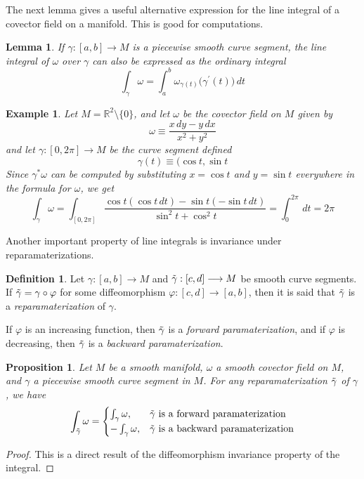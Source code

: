 \documentclass{article}
\newtheorem{proposition}[theorem]{Proposition}
\newtheorem{lemma}[theorem]{Lemma}
\newtheorem{example}{Example}[section]
\theoremstyle{remark}
\theoremstyle{definition}
\newtheorem{definition}{Definition}[section]
\begin{document}
    The next lemma gives a useful alternative expression for the line integral of a covector field on a manifold. This is good for computations.

    \begin{lemma}
    If $\gamma: [a,b] \longrightarrow M$ is a piecewise smooth curve segment, the line integral of $\omega$ over $\gamma$ can also be expressed as the ordinary integral 
    \[\int_\gamma \omega = \int_a^b \omega_{\gamma(t)} \big( \gamma^\prime (t) \big)\,dt\]
    \end{lemma}

    \begin{example}
    Let $M = \mathbb{R}^2 \setminus \{0\}$, and let $\omega$ be the covector field on $M$ given by
    \[\omega \equiv \frac{x \,dy - y\,dx}{x^2 + y^2}\]
    and let $\gamma: [0, 2\pi] \longrightarrow M$ be the curve segment defined 
    \[\gamma(t) \equiv \big( \cos{t}, \sin{t} \]
    Since $\gamma^* \omega$ can be computed by substituting $x = \cos{t}$ and $y = \sin{t}$ everywhere in the formula for $\omega$, we get
    \[\int_\gamma \omega = \int_{[0,2\pi]} \frac{\cos{t} (\cos{t}\,dt) - \sin{t} (-\sin{t}\,dt)}{\sin^2{t} + \cos^2{t}} = \int_0^{2\pi} \,dt = 2\pi\]
    \end{example}

    Another important property of line integrals is invariance under reparamaterizations.

    \begin{definition}
    Let $\gamma: [a,b] \longrightarrow M$ and $\Tilde{\gamma}: [c,d] \longrightarrow M$ be smooth curve segments. If $\Tilde{\gamma} = \gamma \circ \varphi$ for some diffeomorphism $\varphi: [c,d] \longrightarrow [a,b]$, then it is said that $\Tilde{\gamma}$ is a \textit{reparamaterization} of $\gamma$. 

    If $\varphi$ is an increasing function, then $\Tilde{\gamma}$ is a \textit{forward paramaterization}, and if $\varphi$ is decreasing, then $\Tilde{\gamma}$ is a \textit{backward paramaterization}. 
    \end{definition}

    \begin{proposition}
    Let $M$ be a smooth manifold, $\omega$ a smooth covector field on $M$, and $\gamma$ a piecewise smooth curve segment in $M$. For any reparamaterization $\Tilde{\gamma}$ of $\gamma$, we have
    \[\int_{\Tilde{\gamma}} \omega = \begin{cases}
          \int_\gamma \omega, & \Tilde{\gamma} \text{ is a forward paramaterization} \\
          - \int_\gamma \omega, & \Tilde{\gamma} \text{ is a backward paramaterization}
    \end{cases}\]
    \end{proposition}
    \begin{proof}
    This is a direct result of the diffeomorphism invariance property of the integral. 
    \end{proof}
\end{document}
